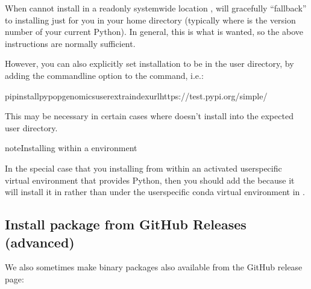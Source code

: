 \documentclass[letterpaper,10pt,english,openany,oneside]{sphinxmanual}
\begin{document}
\sphinxAtStartPar
When  cannot install in a read\sphinxhyphen{}only system\sphinxhyphen{}wide
location ,  will gracefully “fall\sphinxhyphen{}back” to installing just for
you in your home directory (typically 
where  is the version number of your current Python). In
general, this is what is wanted, so the above instructions are
normally sufficient.

\sphinxAtStartPar
However, you can also explicitly set installation to be in the user
directory, by adding the  command\sphinxhyphen{}line option to the  command, i.e.:

\begin{sphinxVerbatim}[commandchars=\\\{\}]
pipinstallpypop\PYGZhy{}genomics\PYGZhy{}\PYGZhy{}user\PYGZhy{}\PYGZhy{}extra\PYGZhy{}index\PYGZhy{}urlhttps://test.pypi.org/simple/
\end{sphinxVerbatim}

\sphinxAtStartPar
This may be necessary in certain cases where  doesn’t
install into the expected user directory.

\begin{sphinxadmonition}{note}{Installing within a  environment}

\sphinxAtStartPar
In the special case that you installing from within an activated
user\sphinxhyphen{}specific  virtual environment that provides Python,
then you should  add the  because it will install
it in  rather than under the user\sphinxhyphen{}specific conda
virtual environment in .
\end{sphinxadmonition}


\subsection{Install package from GitHub Releases (advanced)}
\label{\detokenize{docs/guide-chapter-install:install-package-from-github-releases-advanced}}
\sphinxAtStartPar
We also sometimes make binary packages also available from the GitHub
release page:
\begin{quote}

\sphinxAtStartPar
{}
\end{quote}
\end{document}
